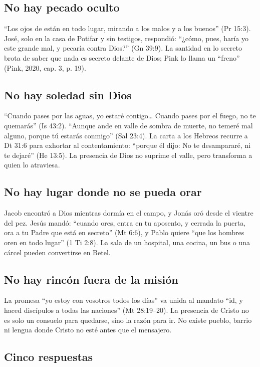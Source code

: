 \subsection{No hay pecado oculto}

``Los ojos de \SENOR{} están en todo lugar, mirando a los malos y a los buenos'' (Pr 15:3). José, solo en la casa de Potifar y sin testigos, respondió: ``¿cómo, pues, haría yo este grande mal, y pecaría contra Dios?'' (Gn 39:9). La santidad en lo secreto brota de saber que nada es secreto delante de Dios; Pink lo llama un ``freno'' (Pink, 2020, cap. 3, p. 19).

\subsection{No hay soledad sin Dios}

``Cuando pases por las aguas, yo estaré contigo\ldots{} Cuando pases por el fuego, no te quemarás'' (Is 43:2). ``Aunque ande en valle de sombra de muerte, no temeré mal alguno, porque tú estarás conmigo'' (Sal 23:4). La carta a los Hebreos recurre a Dt 31:6 para exhortar al contentamiento: ``porque él dijo: No te desampararé, ni te dejaré'' (He 13:5). La presencia de Dios no suprime el valle, pero transforma a quien lo atraviesa.

\subsection{No hay lugar donde no se pueda orar}

Jacob encontró a Dios mientras dormía en el campo, y Jonás oró desde el vientre del pez. Jesús mandó: ``cuando ores, entra en tu aposento, y cerrada la puerta, ora a tu Padre que está en secreto'' (Mt 6:6), y Pablo quiere ``que los hombres oren en todo lugar'' (1 Ti 2:8). La sala de un hospital, una cocina, un bus o una cárcel pueden convertirse en Betel.

\subsection{No hay rincón fuera de la misión}

La promesa ``yo estoy con vosotros todos los días'' va unida al mandato ``id, y haced discípulos a todas las naciones'' (Mt 28:19--20). La presencia de Cristo no es solo un consuelo para quedarse, sino la razón para ir. No existe pueblo, barrio ni lengua donde Cristo no esté antes que el mensajero.

\subsection{Cinco respuestas}

